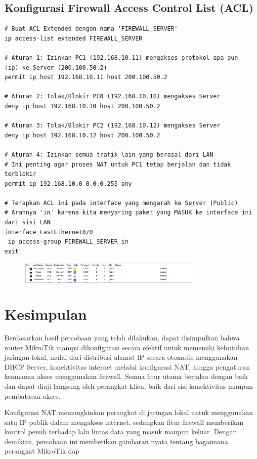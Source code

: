 \subsection{Konfigurasi Firewall Access Control List (ACL)}
\begin{lstlisting}
# Buat ACL Extended dengan nama 'FIREWALL_SERVER'
ip access-list extended FIREWALL_SERVER

# Aturan 1: Izinkan PC1 (192.168.10.11) mengakses protokol apa pun (ip) ke Server (200.100.50.2)
permit ip host 192.168.10.11 host 200.100.50.2

# Aturan 2: Tolak/Blokir PC0 (192.168.10.10) mengakses Server
deny ip host 192.168.10.10 host 200.100.50.2

# Aturan 3: Tolak/Blokir PC2 (192.168.10.12) mengakses Server
deny ip host 192.168.10.12 host 200.100.50.2

# Aturan 4: Izinkan semua trafik lain yang berasal dari LAN
# Ini penting agar proses NAT untuk PC1 tetap berjalan dan tidak terblokir
permit ip 192.168.10.0 0.0.0.255 any

# Terapkan ACL ini pada interface yang mengarah ke Server (Public)
# Arahnya 'in' karena kita menyaring paket yang MASUK ke interface ini dari sisi LAN
interface FastEthernet0/0
 ip access-group FIREWALL_SERVER in
exit
\end{lstlisting}
\begin{figure}[H]
\centering
\includegraphics[width=0.8\textwidth]{P1/img/1.png}
\end{figure}
\section{Kesimpulan}

Berdasarkan hasil percobaan yang telah dilakukan, dapat disimpulkan bahwa router MikroTik mampu dikonfigurasi secara efektif untuk memenuhi kebutuhan jaringan lokal, mulai dari distribusi alamat IP secara otomatis menggunakan DHCP Server, konektivitas internet melalui konfigurasi NAT, hingga pengaturan keamanan akses menggunakan firewall. Semua fitur utama berjalan dengan baik dan dapat diuji langsung oleh perangkat klien, baik dari sisi konektivitas maupun pembatasan akses.

Konfigurasi NAT memungkinkan perangkat di jaringan lokal untuk menggunakan satu IP publik dalam mengakses internet, sedangkan fitur firewall memberikan kontrol penuh terhadap lalu lintas data yang masuk maupun keluar. Dengan demikian, percobaan ini memberikan gambaran nyata tentang bagaimana perangkat MikroTik dap
